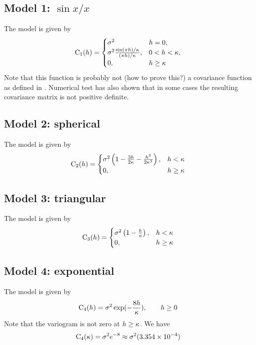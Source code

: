 \documentclass[11pt,a4paper]{amsart}
\begin{document}
\subsection{Model 1: $\sin x/x$}
The model is given by
\begin{align}
  \label{eq:2}
  \operatorname{C}_1(h) =
  \begin{cases}
    \sigma^2 & h = 0,\\
    \sigma^2\frac{\sin (\pi h )/ \kappa}{(\pi h)/\kappa}, & 0 < h < \kappa,\\
    0, & h \geq \kappa
  \end{cases}
\end{align}
Note that this function is probably not (how to prove this?) a covariance function
as defined in \cite{chi12:geo}. Numerical test has also shown that in some cases
the resulting covariance matrix is not positive definite.

\subsection{Model 2:  spherical}
The model is given by \cite{chi12:geo}
\begin{align}
  \label{eq:11}
  \operatorname{C}_2(h) =
  \begin{cases}
    \sigma^2 \left(1 - \frac{3h}{2\kappa} - \frac{h^3}{2\kappa^3}\right), &h<\kappa\\
    0, & h\geq\kappa
  \end{cases}
\end{align}
\subsection{Model 3: triangular}
The model is given by 
\begin{align}
  \label{eq:18}
  \operatorname{C}_3(h) =
  \begin{cases}
    \sigma^2 \left(1 - \frac{h}{\kappa}\right), &h<\kappa\\
    0, & h\geq\kappa
  \end{cases}
\end{align}
\subsection{Model 4: exponential}
The model is given by 
\begin{align}
  \label{eq:19}  
  \operatorname{C}_4(h) =
    \sigma^2 \exp(-\frac{8h}{\kappa}), \qquad h\geq 0
\end{align}
Note that the variogram is not zero at $h \geq \kappa$. We have
\begin{align}
  \label{eq:16}
  \operatorname{C}_4(\kappa) = \sigma^2 e^{-8}\approx \sigma^2 (3.354 \times 10^{-4})
\end{align}
\end{document}
